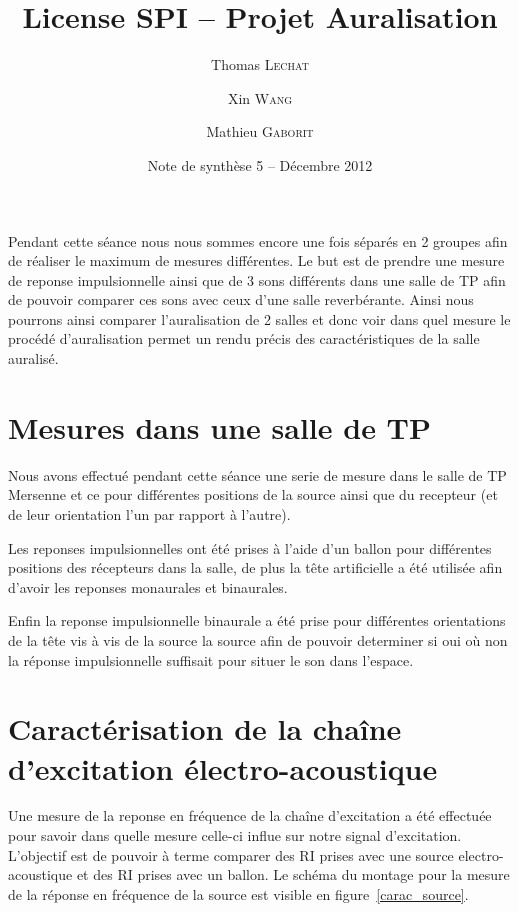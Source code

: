 \documentclass[12pt]{article}
\title{License SPI -- Projet Auralisation}
\author{Thomas \textsc{Lechat} \and Xin \textsc{Wang} \and Mathieu \textsc{Gaborit}}
\date{Note de synthèse 5 -- Décembre 2012}
\begin{document}
\maketitle

Pendant cette séance nous nous sommes encore une fois séparés en 2 groupes afin de réaliser le maximum de mesures différentes. Le but est de prendre une mesure de reponse impulsionnelle ainsi que de 3 sons différents dans une salle de TP afin de pouvoir comparer ces sons avec ceux d'une salle reverbérante. Ainsi nous pourrons ainsi comparer l'auralisation de 2 salles et donc voir dans quel mesure le procédé d'auralisation permet un rendu précis des caractéristiques de la salle auralisé.

\section{Mesures dans une salle de TP} %
Nous avons effectué pendant cette séance une serie de mesure dans le salle de TP Mersenne et ce pour différentes positions de la source ainsi que du recepteur (et de leur orientation l'un par rapport à l'autre). 

Les reponses impulsionnelles ont été prises à l'aide d'un ballon pour différentes positions des récepteurs dans la salle, de plus la tête artificielle a été utilisée afin d'avoir les reponses monaurales et binaurales.  

Enfin la reponse impulsionnelle binaurale a été prise pour différentes orientations de la tête vis à vis de la source la source afin de pouvoir determiner si oui où non la réponse impulsionnelle suffisait pour situer le son dans l'espace.

\section{Caractérisation de la chaîne d'excitation électro-acoustique} %

Une mesure de la reponse en fréquence de la chaîne d'excitation a été effectuée pour savoir dans quelle mesure celle-ci influe sur notre signal d'excitation. L'objectif est de pouvoir à terme comparer des RI prises avec une source electro-acoustique et des RI prises avec un ballon. Le  schéma du montage pour la mesure de la réponse en fréquence de la source est visible en figure~\ref{carac_source}.
\end{document}
